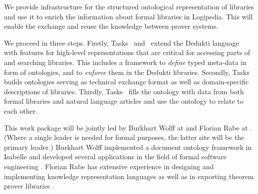 \begin{workpackage}[id=structuring,type=RTD,wphases=1-48,
  short={Structure of the encyclopedia},%
  title={Structure of the encyclopedia},
  lead=FAU,
  wphases=1-48,
  SacRM=40,
  FauRM=20,
  BolRM=4
]



\begin{wpobjectives}
We provide infrastructure for the structured ontological representation of libraries and use it to enrich the information about formal libraries in Logipedia.
This will enable the exchange and reuse the knowledge between prover systems.
\end{wpobjectives}


\begin{wpdescription}
We proceed in three steps.
Firstly, Tasks~ and~ extend the Dedukti language with features for high-level representations that are critical for accessing parts of and searching libraries.
This includes a framework to \emph{define} typed meta-data in form of ontologies, and to \emph{enforce} them in 
the Dedukti libraries.
Secondly, Tasks~ builds ontologies serving as technical exchange format as well as domain-specific descriptions of libraries.
Thirdly, Tasks~ fills the ontology with data from both formal libraries and natural language articles and use the ontology to relate to each other.

This work package will be jointly led by Burkhart Wolff at  and Florian Rabe at .
(Where a single leader is needed for formal purposes, the latter site will be the primary leader.)
Burkhart Wolff implemented a document ontology framework in Isabelle and developed several applications
in the field of formal software engineering \cite{brucker.ea:ontologies-certification:2019,brucker.ea:isabelle-ontologies:2018,brucker.ea:ontologies-certification:2019}.
Florian Rabe has extensive experience in designing and implementing knowledge representation languages \cite{RK:mmt:10,rabe:recon:17} as well as in exporting theorem prover libraries \cite{KR:oafexp:20,CKMRSW:ulo:19}.
\end{wpdescription}


\end{workpackage}
